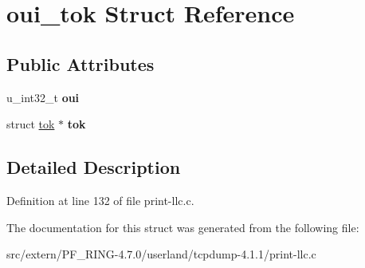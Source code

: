 \hypertarget{structoui__tok}{
\section{oui\_\-tok Struct Reference}
\label{structoui__tok}
}
\subsection*{Public Attributes}
\begin{DoxyCompactItemize}
\item 
\hypertarget{structoui__tok_a07f5e99483dc1648dd80820badfdecd2}{
u\_\-int32\_\-t {\bfseries oui}}
\label{structoui__tok_a07f5e99483dc1648dd80820badfdecd2}

\item 
\hypertarget{structoui__tok_acfa8e515172d45e6dcaa6937315e6489}{
struct \hyperlink{structtok}{tok} $\ast$ {\bfseries tok}}
\label{structoui__tok_acfa8e515172d45e6dcaa6937315e6489}

\end{DoxyCompactItemize}


\subsection{Detailed Description}


Definition at line 132 of file print-\/llc.c.



The documentation for this struct was generated from the following file:\begin{DoxyCompactItemize}
\item 
src/extern/PF\_\-RING-\/4.7.0/userland/tcpdump-\/4.1.1/print-\/llc.c\end{DoxyCompactItemize}
